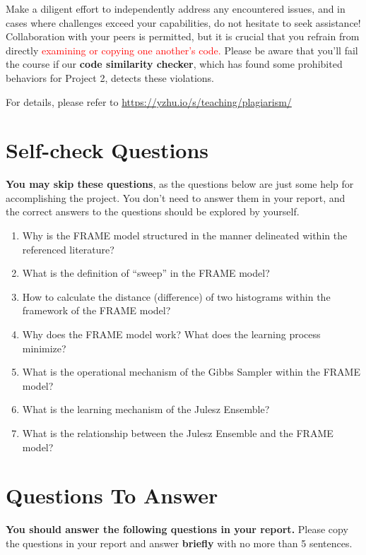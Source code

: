 \documentclass[11pt]{article}
\begin{document}
Make a diligent effort to independently address any encountered issues, and in cases where challenges exceed your capabilities, do not hesitate to seek assistance! Collaboration with your peers is permitted, but it is crucial that you refrain from directly \textcolor{red}{examining or copying one another's code.}  Please be aware that you'll fail the course if our \textbf{code similarity checker}, which has found some prohibited behaviors for Project 2, detects these violations.

For details, please refer to \url{https://yzhu.io/s/teaching/plagiarism/}

\clearpage

\section{Self-check Questions}

\textbf{You may skip these questions}, as the questions below are just some help for accomplishing the project. You don't need to answer them in your report, and the correct answers to the questions should be explored by yourself. 
\begin{enumerate}
    \item Why is the FRAME model structured in the manner delineated within the referenced literature?
    \item What is the definition of ``sweep'' in the FRAME model?
    \item How to calculate the distance (difference) of two histograms within the framework of the FRAME model?
    \item Why does the FRAME model work? What does the learning process minimize?
    \item What is the operational mechanism of the Gibbs Sampler within the FRAME model?
    \item What is the learning mechanism of the Julesz Ensemble?
    \item What is the relationship between the Julesz Ensemble and the FRAME model?
\end{enumerate}
\section{Questions To Answer}
\textbf{You should answer the following questions in your report.} Please copy the questions in your report and answer \textbf{briefly} with no more than 5 sentences. 
\end{document}
